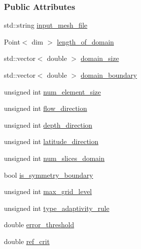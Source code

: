 \subsubsection*{Public Attributes}
\begin{DoxyCompactItemize}
\item 
std\+::string \hyperlink{struct_u_b_c__mis__mixing_1_1_parameters_aac252c8e13f3b044975af28070f2f756}{input\+\_\+mesh\+\_\+file}
\item 
Point$<$ dim $>$ \hyperlink{struct_u_b_c__mis__mixing_1_1_parameters_a24a6cf602ba017ad9f6504fb0ac083dd}{length\+\_\+of\+\_\+domain}
\item 
std\+::vector$<$ double $>$ \hyperlink{struct_u_b_c__mis__mixing_1_1_parameters_afb1287d7ff99313c1810618d9ba3e88d}{domain\+\_\+size}
\item 
std\+::vector$<$ double $>$ \hyperlink{struct_u_b_c__mis__mixing_1_1_parameters_ab5dd18f3f93bdac91f6d9ac765f7b0f2}{domain\+\_\+boundary}
\item 
unsigned int \hyperlink{struct_u_b_c__mis__mixing_1_1_parameters_a165c8e3abf1f41603587816b9016c612}{num\+\_\+element\+\_\+size}
\item 
unsigned int \hyperlink{struct_u_b_c__mis__mixing_1_1_parameters_a5a6ccb735b9c9aa71b1a9f85fc255315}{flow\+\_\+direction}
\item 
unsigned int \hyperlink{struct_u_b_c__mis__mixing_1_1_parameters_abaad9269bbf285086d40e5d8c3a6bbdd}{depth\+\_\+direction}
\item 
unsigned int \hyperlink{struct_u_b_c__mis__mixing_1_1_parameters_a1fb7274b6cc0e9ae893a3eab78c1e570}{latitude\+\_\+direction}
\item 
unsigned int \hyperlink{struct_u_b_c__mis__mixing_1_1_parameters_a3255a2145157e46b3d14e3eb39e4e518}{num\+\_\+slices\+\_\+domain}
\item 
bool \hyperlink{struct_u_b_c__mis__mixing_1_1_parameters_a4a1b3e4a709cf64c32d76435c2b090ac}{is\+\_\+symmetry\+\_\+boundary}
\item 
unsigned int \hyperlink{struct_u_b_c__mis__mixing_1_1_parameters_ae62b04744b770122b229fcabe1507274}{max\+\_\+grid\+\_\+level}
\item 
unsigned int \hyperlink{struct_u_b_c__mis__mixing_1_1_parameters_acace64be0270631ad440144d231187b0}{type\+\_\+adaptivity\+\_\+rule}
\item 
double \hyperlink{struct_u_b_c__mis__mixing_1_1_parameters_a13ee78e31e67b8d1f2cdc298e55fcad9}{error\+\_\+threshold}
\item 
double \hyperlink{struct_u_b_c__mis__mixing_1_1_parameters_a1cb12452f4e62d63463960a293b6fcfe}{ref\+\_\+crit}

\end{DoxyCompactItemize}
